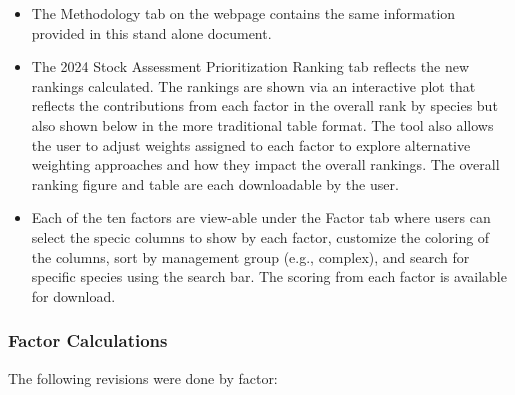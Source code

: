 \documentclass[11pt,
  english,
  a4paper,
]{article}
\begin{document}
\begin{itemize}
\item
  The Methodology tab on the webpage contains the same information provided in this stand alone document.
\item
  The 2024 Stock Assessment Prioritization Ranking tab reflects the new rankings calculated. The rankings are shown via an interactive plot that reflects the contributions from each factor in the overall rank by species but also shown below in the more traditional table format. The tool also allows the user to adjust weights assigned to each factor to explore alternative weighting approaches and how they impact the overall rankings. The overall ranking figure and table are each downloadable by the user.
\item
  Each of the ten factors are view-able under the Factor tab where users can select the specic columns to show by each factor, customize the coloring of the columns, sort by management group (e.g., complex), and search for specific species using the search bar. The scoring from each factor is available for download.
\end{itemize}

\hypertarget{factor-calculations}{%
\subsubsection{Factor Calculations}\label{factor-calculations}}

The following revisions were done by factor:
\end{document}
